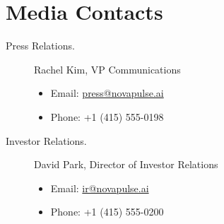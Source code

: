 \documentclass[
    language=english,
    doctype=press-release,
    institution=none,
]{../../omnilatex}
\begin{document}
\section*{Media Contacts}

\begin{description}
    \item[Press Relations.] Rachel Kim, VP Communications
        \begin{itemize}
            \item Email: \href{mailto:press@novapulse.ai}{press@novapulse.ai}
            \item Phone: +1 (415) 555-0198
        \end{itemize}
    \item[Investor Relations.] David Park, Director of Investor Relations
        \begin{itemize}
            \item Email: \href{mailto:ir@novapulse.ai}{ir@novapulse.ai}
            \item Phone: +1 (415) 555-0200
        \end{itemize}
\end{description}

\printbibliography[heading=none]
\end{document}
